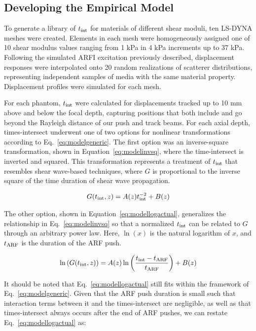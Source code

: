 \subsection{Developing the Empirical Model}

To generate a library of $t_{\textnormal{int}}$ for materials of different shear moduli, ten LS-DYNA meshes were created. Elements in each mesh were homogeneously assigned one of 10 shear modulus values ranging from 1 kPa in 4 kPa increments up to 37 kPa. Following the simulated ARFI excitation previously described, displacement responses were interpolated onto 20 random realizations of scatterer distributions, representing independent samples of media with the same material property. Displacement profiles were simulated for each mesh.

For each phantom, $t_{\textnormal{int}}$ were calculated for displacements tracked up to 10 mm above and below the focal depth, capturing positions that both include and go beyond the Rayleigh distance of our push and track beams. For each axial depth, times-intersect underwent one of two options for nonlinear transformations according to Eq.~\ref{eq:modelgeneric}. The first option was an inverse-square transformation, shown in Equation~\ref{eq:modelinvsq}, where the time-intersect is inverted and squared. This transformation represents a treatment of $t_{\textnormal{int}}$ that resembles shear wave-based techniques, where $G$ is proportional to the inverse square of the time duration of shear wave propagation.

\begin{equation}
G(t_{\textnormal{int}}, z) = A(z) t_{\textnormal{int}}^{-2} + B(z)
\label{eq:modelinvsq}
\end{equation}

The other option, shown in Equation~\ref{eq:modellogactual}, generalizes the relationship in Eq.~\ref{eq:modelinvsq} so that a normalized $t_{\textnormal{int}}$ can be related to $G$ through an arbitrary power law. Here, $\ln\left(x\right)$ is the natural logarithm of $x$, and $t_{\textnormal{ARF}}$ is the duration of the ARF push.

\begin{equation}
\ln\left( G(t_{\textnormal{int}}, z) \right) = A(z) \ln\left( \frac{t_{\textnormal{int}} - t_{\textnormal{ARF}}}{t_{\textnormal{ARF}}} \right) + B(z) 
\label{eq:modellogactual}
\end{equation}

\noindent{}It should be noted that Eq.~\ref{eq:modellogactual} still fits within the framework of Eq.~\ref{eq:modelgeneric}. Given that the ARF push duration is small such that interaction terms between it and the times-intersect are negligible, as well as that times-intersect always occurs after the end of ARF pushes, we can restate Eq.~\ref{eq:modellogactual} as:

